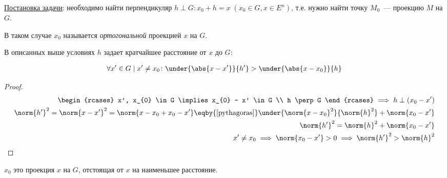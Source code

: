 
\begin{twocolumns}
  
  \columnbreak

  \underline{Постановка задачи}: необходимо найти перпендикуляр
  \(h \perp G \colon x_{0} + h = x \; (x_{0} \in G, x \in E^{n})\), т.е. нужно
  найти точку \(M_{0}\)~--- проекцию \(M\) на \(G\).

  В таком случае \(x_{0}\) называется \textit{ортогональной} проекцией \(x\) на
  \(G\).

  \begin{theorem}
    В описанных выше условиях \(h\) задает кратчайшее расстояние от \(x\) до
    \(G\):

    \begin{align*}
      \forall x' \in G \mid x' \neq x_{0} \colon
        \under{\abs{x - x'}}{h'} > \under{\abs{x - x_{0}}}{h}
    \end{align*}
  \end{theorem}
\end{twocolumns}

\begin{proof}
  \begin{align*}
    \begin{rcases}
      x', x_{0} \in G \implies x_{0} - x' \in G \\
      h \perp G
    \end{rcases}
    \implies h \perp (x_{0} - x') \\
    \norm{h'}^2
    = \norm{x - x'}^2
    = \norm{x - x_{0} + x_{0} - x'}
    \eqby{\ref{pythagoras}}
    \under{\norm{x - x_{0}}^2}{\norm{h}^2} + \norm{x_{0} - x'}
    \\
    \norm{h'}^2 = \norm{h}^2 + \norm{x_{0} - x'}
    \\
    x' \neq x_{0}
    \implies \norm{x_{0} - x'} > 0
    \implies \norm{h'}^2 > \norm{h}^2
  \end{align*}
\end{proof}

\begin{remark}
  \(x_{0}\) это проекция \(x\) на \(G\), отстоящая от \(x\) на наименьшее
  расстояние.
\end{remark}

